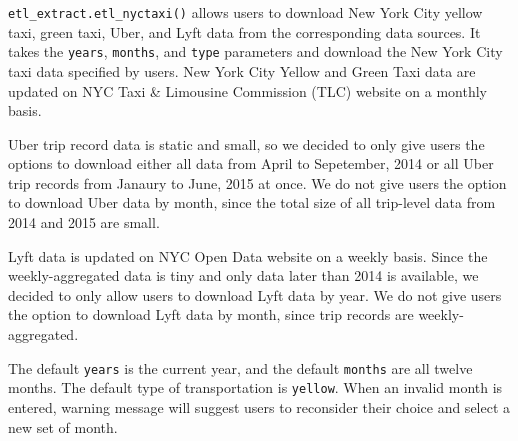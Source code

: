 \documentclass[12pt,twoside]{reedthesis}
\newenvironment{Shaded}{\begin{snugshade}}{\end{snugshade}}
\newcommand{\KeywordTok}[1]{\textcolor[rgb]{0.13,0.29,0.53}{\textbf{#1}}}
\newcommand{\DataTypeTok}[1]{\textcolor[rgb]{0.13,0.29,0.53}{#1}}
\newcommand{\DecValTok}[1]{\textcolor[rgb]{0.00,0.00,0.81}{#1}}
\newcommand{\StringTok}[1]{\textcolor[rgb]{0.31,0.60,0.02}{#1}}
\newcommand{\OperatorTok}[1]{\textcolor[rgb]{0.81,0.36,0.00}{\textbf{#1}}}
\newcommand{\NormalTok}[1]{#1}
\theoremstyle{definition}
\theoremstyle{definition}
\theoremstyle{definition}
\theoremstyle{remark}
\begin{document}
\texttt{etl\_extract.etl\_nyctaxi()} allows users to download New York
City yellow taxi, green taxi, Uber, and Lyft data from the corresponding
data sources. It takes the \texttt{years}, \texttt{months}, and
\texttt{type} parameters and download the New York City taxi data
specified by users. New York City Yellow and Green Taxi data are updated
on NYC Taxi \& Limousine Commission (TLC) website on a monthly basis.
\begin{Shaded}
\end{Shaded}
Uber trip record data is static and small, so we decided to only give
users the options to download either all data from April to Sepetember,
2014 or all Uber trip records from Janaury to June, 2015 at once. We do
not give users the option to download Uber data by month, since the
total size of all trip-level data from 2014 and 2015 are small.
\begin{Shaded}
\end{Shaded}
Lyft data is updated on NYC Open Data website on a weekly basis. Since
the weekly-aggregated data is tiny and only data later than 2014 is
available, we decided to only allow users to download Lyft data by year.
We do not give users the option to download Lyft data by month, since
trip records are weekly-aggregated.
\begin{Shaded}
\end{Shaded}
The default \texttt{years} is the current year, and the default
\texttt{months} are all twelve months. The default type of
transportation is \texttt{yellow}. When an invalid month is entered,
warning message will suggest users to reconsider their choice and select
a new set of month.
\end{document}
